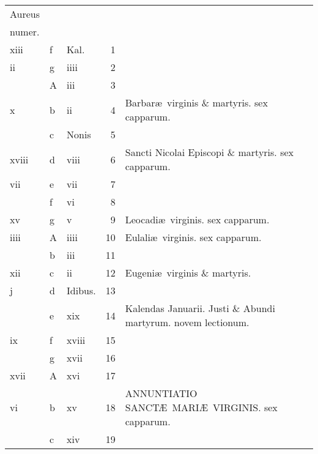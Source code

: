 \documentclass[11pt,openany]{book}
\begin{document}
\begin{center}
\begin{tabular}{l | l | l | r | l r}
\color{Red}Aureus & & & & \color{Red} \\
\color{Red}numer. & & & & \color{Red} \\
\color{Red} xiii & f & \color{Red} Kal. & 1 & & \color{Red} \\
\color{Red} ii & g & \color{Red} iiii & 2 & & \color{Red} \\
\color{Red}  & \color{Red} A & \color{Red} iii & 3 & & \color{Red} \\
\color{Red} x & b & \color{Red} ii & 4 & Barbar\ae \ virginis \& martyris. \color{Red} sex capparum. & \color{Red} \\
\color{Red}  & c & Nonis & 5 & & \color{Red} \\
\color{Red} xviii & d & \color{Red} viii & 6 & Sancti Nicolai Episcopi \& martyris. \color{Red} sex capparum. & \color{Red} \\
\color{Red} vii & e & \color{Red} vii & 7 & & \color{Red} \\
\color{Red}  & f & \color{Red} vi & 8 & & \color{Red} \\
\color{Red} xv & g & \color{Red} v & 9 & \color{Red} Leocadi\ae \ virginis. \color{black} sex capparum. & \color{Red} \\
\color{Red} iiii & \color{Red} A & \color{Red} iiii & 10 & \color{Red} Eulali\ae \ virginis. \color{black} sex capparum. & \color{Red} \\
\color{Red}  & b & \color{Red} iii & 11 & & \color{Red} \\
\color{Red} xii & c & \color{Red} ii & 12 & Eugeni\ae \ virginis \& martyris. & \color{Red} \\
\color{Red} j & d & Idibus. & 13 & & \color{Red} \\
\color{Red}  & e & \color{Red} xix & 14 & \qquad \color{Red} Kalendas Januarii. \color{black} Justi \& Abundi martyrum. \color{Red} novem lectionum. & \color{Red} \\
\color{Red} ix & f & \color{Red} xviii & 15 & & \color{Red} \\
\color{Red}  & g & \color{Red} xvii & 16 & & \color{Red} \\
\color{Red} xvii & \color{Red} A & \color{Red} xvi & 17 & & \color{Red} \\
\color{Red} vi & b & \color{Red} xv & 18 & ANNUNTIATIO SANCT\AE \ MARI\AE \ VIRGINIS. \color{Red} sex capparum. & \color{Red} \\
\color{Red}  & c & \color{Red} xiv & 19 & & \color{Red} \\

\end{tabular}
\end{center}
\end{document}
